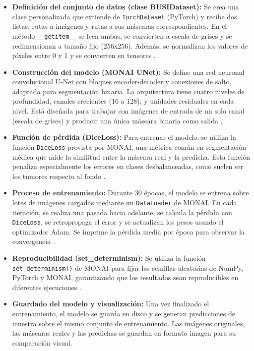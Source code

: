 \documentclass[12pt]{article}
\begin{document}
\begin{itemize}

    \item \textbf{Definición del conjunto de datos (clase BUSIDataset):} Se crea una clase personalizada que extiende de \texttt{TorchDataset} (PyTorch) y recibe dos listas: rutas a imágenes y rutas a sus máscaras correspondientes. En el método \texttt{\_\_getitem\_\_} se leen ambas, se convierten a escala de grises y se redimensionan a tamaño fijo (256x256). Además, se normalizan los valores de píxeles entre 0 y 1 y se convierten en tensores \cite{pytorch_dataset_doc}.

    \item \textbf{Construcción del modelo (MONAI UNet):} Se define una red neuronal convolucional U-Net con bloques encoder-decoder y conexiones de salto, adaptada para segmentación binaria. La arquitectura tiene cuatro niveles de profundidad, canales crecientes (16 a 128), y unidades residuales en cada nivel. Está diseñada para trabajar con imágenes de entrada de un solo canal (escala de grises) y producir una única máscara binaria como salida \cite{monai_unet}.

    \item \textbf{Función de pérdida (DiceLoss):} Para entrenar el modelo, se utiliza la función \texttt{DiceLoss} provista por MONAI, una métrica común en segmentación médica que mide la similitud entre la máscara real y la predicha. Esta función penaliza especialmente los errores en clases desbalanceadas, como suelen ser los tumores respecto al fondo \cite{monai_dice_loss}.

    \item \textbf{Proceso de entrenamiento:} Durante 30 épocas, el modelo se entrena sobre lotes de imágenes cargadas mediante un \texttt{DataLoader} de MONAI. En cada iteración, se realiza una pasada hacia adelante, se calcula la pérdida con \texttt{DiceLoss}, se retropropaga el error y se actualizan los pesos usando el optimizador Adam. Se imprime la pérdida media por época para observar la convergencia \cite{pytorch_optim}.

    \item \textbf{Reproducibilidad (set\_determinism):} Se utiliza la función \texttt{set\_determinism()} de MONAI para fijar las semillas aleatorias de NumPy, PyTorch y MONAI, garantizando que los resultados sean reproducibles en diferentes ejecuciones \cite{monai_determinism}.

    \item \textbf{Guardado del modelo y visualización:} Una vez finalizado el entrenamiento, el modelo se guarda en disco y se generan predicciones de muestra sobre el mismo conjunto de entrenamiento. Las imágenes originales, las máscaras reales y las predichas se guardan en formato imagen para su comparación visual.

\end{itemize}
\end{document}

